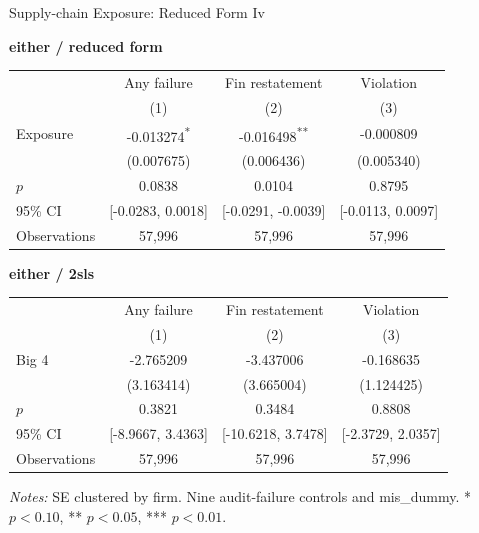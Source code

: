 \documentclass[10pt]{article}
\newcommand{\sym}[1]{\textsuperscript{#1}}
\begin{document}
\fontsize{10}{12}\selectfont
\setlength{\tabcolsep}{3pt}\renewcommand{\arraystretch}{1.15}
\begin{center}\large Supply-chain Exposure: Reduced Form Iv\end{center}
\medskip\textbf{either / reduced form}\par\smallskip
\begin{tabular*}{\textwidth}{@{\extracolsep{\fill}}lccc@{}}
\toprule
 & Any failure & Fin restatement & Violation \\
 & (1) & (2) & (3) \\
\midrule
Exposure & -0.013274\sym{*} & -0.016498\sym{**} & -0.000809 \\
 & (0.007675) & (0.006436) & (0.005340) \\
$p$ & 0.0838 & 0.0104 & 0.8795 \\
95\% CI & [-0.0283, 0.0018] & [-0.0291, -0.0039] & [-0.0113, 0.0097] \\
Observations & 57,996 & 57,996 & 57,996 \\
\bottomrule\end{tabular*}\par
\medskip\textbf{either / 2sls}\par\smallskip
\begin{tabular*}{\textwidth}{@{\extracolsep{\fill}}lccc@{}}
\toprule
 & Any failure & Fin restatement & Violation \\
 & (1) & (2) & (3) \\
\midrule
Big 4 & -2.765209 & -3.437006 & -0.168635 \\
 & (3.163414) & (3.665004) & (1.124425) \\
$p$ & 0.3821 & 0.3484 & 0.8808 \\
95\% CI & [-8.9667, 3.4363] & [-10.6218, 3.7478] & [-2.3729, 2.0357] \\
Observations & 57,996 & 57,996 & 57,996 \\
\bottomrule\end{tabular*}\par
\medskip\fontsize{9}{11}\selectfont\textit{Notes:} SE clustered by firm. Nine audit-failure controls and mis\_dummy. * $p<0.10$, ** $p<0.05$, *** $p<0.01$.
\end{document}
